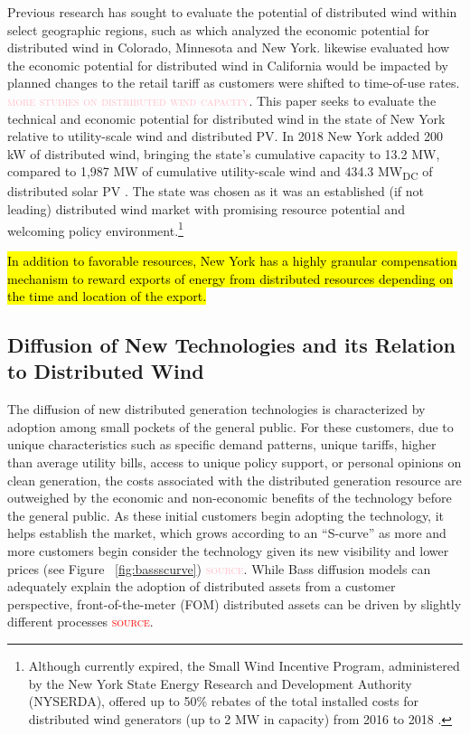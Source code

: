 Previous research has sought to evaluate the potential of distributed wind within select geographic regions, such as \citet*{mccabe_assessment_2018} which analyzed the economic potential for distributed wind in Colorado, Minnesota and New York. \citet*{ramdas_california_2019} likewise evaluated how the economic potential for distributed wind in California would be impacted by planned changes to the retail tariff as customers were shifted to time-of-use rates. \textcolor{pink}{\textsc{more studies on distributed wind capacity}}. This paper seeks to evaluate the technical and economic potential for distributed wind in the state of New York relative to utility-scale wind and distributed PV. In 2018 New York added 200 kW of distributed wind, bringing the state's cumulative capacity to 13.2 MW, compared to 1,987 MW of cumulative utility-scale wind and 434.3 MW\textsubscript{DC} of distributed solar PV \cite{orrell_2018_2019,wiser_2018_2019,solar_energy_industries_association_us_2019}. The state was chosen as it was an established (if not leading) distributed wind market with promising resource potential and welcoming policy environment.\footnote{Although currently expired, the Small Wind Incentive Program, administered by the New York State Energy Research and Development Authority (NYSERDA), offered up to 50\% rebates of the total installed costs for distributed wind generators (up to 2 MW in capacity) from 2016 to 2018 \cite{nyserda_public_2019}.} 

\hl{In addition to favorable resources, New York has a highly granular compensation mechanism to reward exports of energy from distributed resources depending on the time and location of the export.}

\subsection{Diffusion of New Technologies and its Relation to Distributed Wind}
\label{intro_diff}

The diffusion of new distributed generation technologies is characterized by adoption among small pockets of the general public. For these customers, due to unique characteristics such as specific demand patterns, unique tariffs, higher than average utility bills, access to unique policy support, or personal opinions on clean generation, the costs associated with the distributed generation resource are outweighed by the economic and non-economic benefits of the technology before the general public. As these initial customers begin adopting the technology, it helps establish the market, which grows according to an ``S-curve'' as more and more customers begin consider the technology given its new visibility and lower prices (see Figure ~\ref{fig:bassscurve}) \textcolor{pink}{\textsc{source}}. While Bass diffusion models can adequately explain the adoption of distributed assets from a customer perspective, front-of-the-meter (FOM) distributed assets can be driven by slightly different processes \textcolor{red}{\textsc{source}}. 

